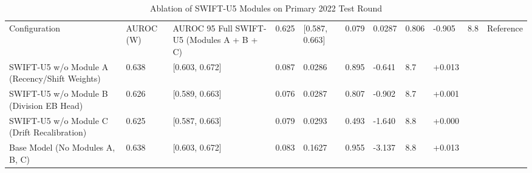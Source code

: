 \begin{table}[htbp]
\centering
\small
\begin{tabular}{lllllllll}
\toprule
Configuration & AUROC (W) & AUROC 95%
\midrule
Full SWIFT-U5 (Modules A + B + C) & 0.625 & [0.587, 0.663] & 0.079 & 0.0287 & 0.806 & -0.905 & 8.8 & Reference \\
SWIFT-U5 w/o Module A (Recency/Shift Weights) & 0.638 & [0.603, 0.672] & 0.087 & 0.0286 & 0.895 & -0.641 & 8.7 & +0.013 \\
SWIFT-U5 w/o Module B (Division EB Head) & 0.626 & [0.589, 0.663] & 0.076 & 0.0287 & 0.807 & -0.902 & 8.7 & +0.001 \\
SWIFT-U5 w/o Module C (Drift Recalibration) & 0.625 & [0.587, 0.663] & 0.079 & 0.0293 & 0.493 & -1.640 & 8.8 & +0.000 \\
Base Model (No Modules A, B, C) & 0.638 & [0.603, 0.672] & 0.083 & 0.1627 & 0.955 & -3.137 & 8.8 & +0.013 \\
\bottomrule
\end{tabular}
\caption{Ablation of SWIFT-U5 Modules on Primary 2022 Test Round}
\label{tab:table5_ablation}
\end{table}